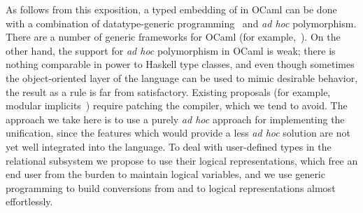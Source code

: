 As follows from this exposition, a typed embedding of \miniKanren in OCaml can be done with
a combination of datatype-generic programming~\cite{DGP} and \emph{ad hoc} polymorphism. There are a 
number of generic frameworks for OCaml (for example,~\cite{Deriving}). On the other hand, the support
for \emph{ad hoc} polymorphism in OCaml is weak; there is nothing comparable in power to Haskell 
type classes, and even though sometimes the object-oriented layer of the language can be used to mimic
desirable behavior, the result as a rule is far from satisfactory. Existing proposals (for example, 
modular implicits~\cite{Implicits}) require patching the compiler, which we tend to avoid.
The approach we take here is to use a purely \emph{ad hoc} approach for implementing the unification, since the features 
which would provide a less \emph{ad hoc} solution are not yet well integrated into the language. To deal
with user-defined types in the relational subsystem we propose to use their logical representations, which free an end user
from the burden to maintain logical variables, and we use generic programming to build conversions from and to logical 
representations almost effortlessly.



